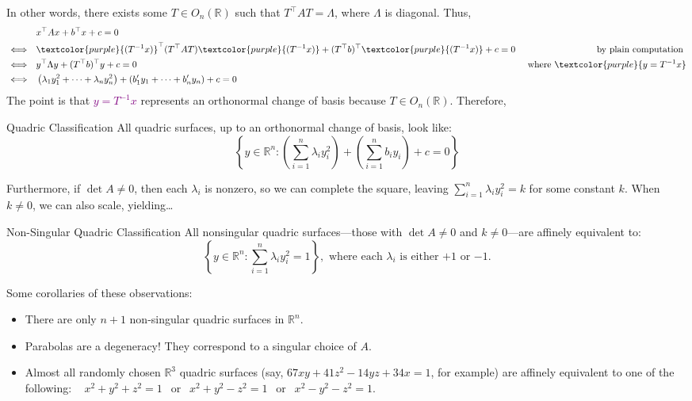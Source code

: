 In other words, there exists some $T \in O_n(\mathbb{R})$ such that $T^{\top}AT = \Lambda$, where $\Lambda$ is diagonal.  Thus,
\begin{align*}
    & x^{\top}Ax + b^{\top}x + c = 0 \\
    \iff ~~ & \textcolor{purple}{(T^{-1}x)}^{\top} (T^{\top}AT)\textcolor{purple}{(T^{-1}x)} + (T^{\top}b)^{\top}\textcolor{purple}{(T^{-1}x)} + c = 0 & \text{ by plain computation } \\
    \iff ~~ & y^{\top}\Lambda y + (T^{\top}b)^{\top}y + c = 0 & \text{ where } \textcolor{purple}{y = T^{-1}x} \\
    \iff ~~ & \left(\lambda_1y_1^2 + \dots + \lambda_ny_n^2\right) + \left(b_1'y_1 + \dots + b_n'y_n\right) + c = 0
\end{align*}
The point is that \textcolor{purple}{$y = T^{-1}x$} represents an orthonormal change of basis because $T \in O_n(\mathbb{R})$.  Therefore,

\begin{theorem}{Quadric Classification}
    All quadric surfaces, up to an orthonormal change of basis, look like:
    \[ \left\{ y \in \mathbb{R}^n : \left(\sum_{i = 1}^n \lambda_i y_i^2\right) + \left(\sum_{i = 1}^n b_i y_i \right) + c = 0 \right \} \] \vspace{-0.3cm}
\end{theorem}

Furthermore, if $\det A \neq 0$, then each $\lambda_i$ is nonzero, so we can complete the square, leaving $\sum_{i = 1}^n \lambda_i y_i^2 = k$ for some constant $k$.  When $k \neq 0$, we can also scale, yielding\dots

\begin{theorem}{Non-Singular Quadric Classification}
    All nonsingular quadric surfaces---those with $\det A \neq 0$ and $k \neq 0$---are affinely equivalent to:
    \[ \left\{ y \in \mathbb{R}^n : \sum_{i = 1}^n \lambda_i y_i^2 = 1 \right \}, \text{ where each $\lambda_i$ is either $+1$ or $-1$.} \] \vspace{-0.5cm}
\end{theorem}

Some corollaries of these observations:
\begin{itemize}
    \item There are only $n + 1$ non-singular quadric surfaces in $\mathbb{R}^n$.
    \item Parabolas are a degeneracy!  They correspond to a singular choice of $A$.
    \item Almost all randomly chosen $\mathbb{R}^3$ quadric surfaces (say, $67xy + 41z^2 - 14yz + 34x = 1$, for example) are affinely equivalent to one of the following: ~ $x^2 + y^2 + z^2 = 1 ~~ \text{ or } ~~ x^2 + y^2 - z^2 = 1 ~~ \text{ or } ~~ x^2 - y^2 - z^2 = 1$.
\end{itemize}




